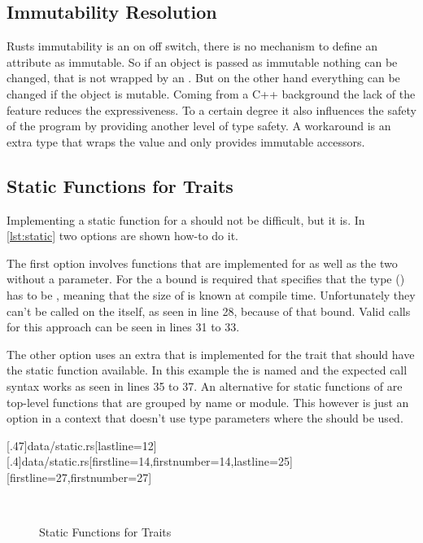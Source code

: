 \documentclass[thesis]{subfiles}
\begin{document}

  \subsection{Immutability Resolution}
    Rusts immutability is an on off switch, there is no mechanism to define an attribute as immutable.
    So if an object is passed as immutable nothing can be changed, that is not wrapped by an \UnsafeCellT.
    But on the other hand everything can be changed if the object is mutable.
    Coming from a C++ background the lack of the  feature reduces the expressiveness.
    To a certain degree it also influences the safety of the program by providing another level of type safety\autocite[30ff.]{cpp101}.
    A workaround is an extra type that wraps the value and only provides immutable accessors.

  \subsection{Static Functions for Traits}
    Implementing a static function for a \trait should not be difficult, but it is.
    In \autoref{lst:static} two options are shown how-to do it.

    The first option involves functions that are implemented for \Foo as well as the two \traits without a \self parameter.
    For the \traits a bound is required that specifies that the \self type (\Self) has to be \Sized, meaning that the size of \Self is known at compile time.
    Unfortunately they can't be called on the \trait itself, as seen in line 28, because of that bound.
    Valid calls for this approach can be seen in lines 31 to 33.

    The other option uses an extra \trait that is implemented for the trait that should have the static function available.
    In this example the \trait is named  and the expected call syntax works as seen in lines 35 to 37.
    An alternative for static functions of \traits are top-level functions that are grouped by name or module.
    This however is just an option in a context that doesn't use type parameters where the \trait should be used.

    \LstTikzBox{\staticOne}[.47\linewidth]{data/static.rs}[lastline=12]
    \LstTikzBox{\staticTwo}[.4\linewidth]{data/static.rs}[firstline=14,firstnumber=14,lastline=25]
    [firstline=27,firstnumber=27]
    \begin{figure}[ht]
      \captionsetup{type=lstlisting}
      \centering
      \usebox{\staticOne}\hfill%
      \usebox{\staticTwo}\\\vspace*{.75em}%
      \usebox{\staticThree}
      \caption{Static Functions for Traits}\label{lst:static}
    \end{figure}
\end{document}
